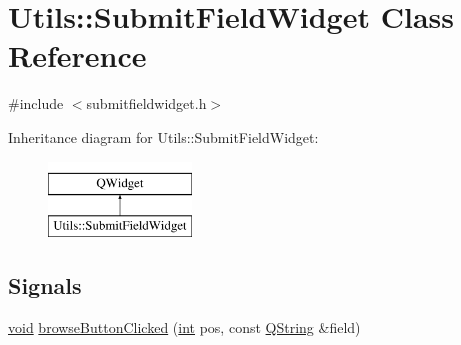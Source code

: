 \hypertarget{class_utils_1_1_submit_field_widget}{\section{Utils\-:\-:Submit\-Field\-Widget Class Reference}
\label{class_utils_1_1_submit_field_widget}
}


{\ttfamily \#include $<$submitfieldwidget.\-h$>$}

Inheritance diagram for Utils\-:\-:Submit\-Field\-Widget\-:\begin{figure}[H]
\begin{center}
\leavevmode
\includegraphics[height=2.000000cm]{class_utils_1_1_submit_field_widget}
\end{center}
\end{figure}
\subsection*{Signals}
\begin{DoxyCompactItemize}
\item 
\hyperlink{group___u_a_v_objects_plugin_ga444cf2ff3f0ecbe028adce838d373f5c}{void} \hyperlink{class_utils_1_1_submit_field_widget_adc7d1b6d1536cfcb44cabe89c27bfeec}{browse\-Button\-Clicked} (\hyperlink{ioapi_8h_a787fa3cf048117ba7123753c1e74fcd6}{int} pos, const \hyperlink{group___u_a_v_objects_plugin_gab9d252f49c333c94a72f97ce3105a32d}{Q\-String} \&field)
\end{DoxyCompactItemize}
